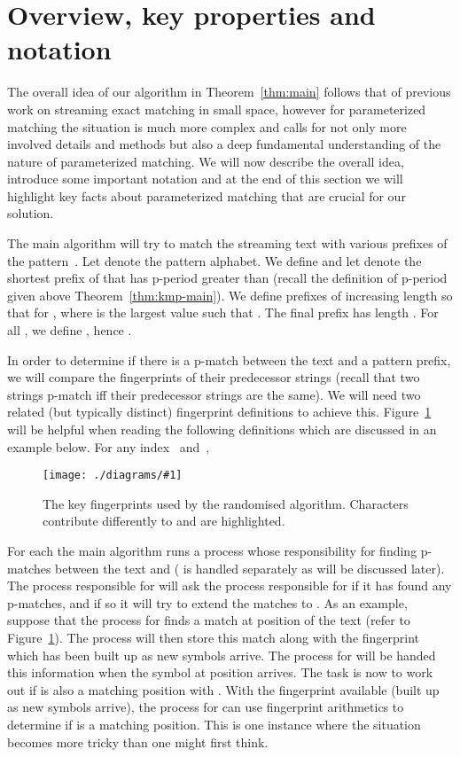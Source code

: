 \documentclass[11pt,a4paper]{article}
\theoremstyle{theorem}
\newcommand{\pmatch}{\mbox{p-match}\xspace}
\newcommand{\pmatches}{\mbox{p-matches}\xspace}
\newcommand{\pperiod}{\mbox{p-period}\xspace}
\newcommand{\insertdiagram}[1]{
    \centering
    \texttt{[image: ./diagrams/\#1]}}
\newcommand{\insertfigure}[2]{
    \begin{figure}[t]
        \centering
        \insertdiagram{#1}
        \caption{#2}
    \end{figure}
    }
\begin{document}
\section{Overview, key properties and notation}\label{sec:overview}

The overall idea of our algorithm in Theorem~\ref{thm:main} follows that of previous work on streaming exact matching in small space, however for parameterized matching the situation is much more complex and calls for not only more involved details and methods but also a deep fundamental understanding of the nature of parameterized matching. We will now describe the overall idea, introduce some important notation and at the end of this section we will highlight  key facts about parameterized matching that are crucial for our solution. 

The main algorithm will try to match the streaming text with various prefixes of the pattern~. Let  denote the pattern alphabet.
We define  and
let  denote the shortest prefix of  that has
\pperiod greater than  (recall the definition of \pperiod given above Theorem~\ref{thm:kmp-main}).
We define  prefixes  of increasing length so that
 for , where  is the largest value such that . The final prefix  has length .
For all , we define , hence . 


In order to determine if there is a \pmatch between the text and a pattern prefix, we will compare the fingerprints of their predecessor strings (recall that two strings \pmatch iff their predecessor strings are the same).
We will need two related (but typically distinct) fingerprint definitions to achieve this. Figure~\ref{fig:fp-output} will be helpful when reading the following definitions which are discussed in an example below.
For any index~ and~,


\insertfigure{phi-fingerprints}{\label{fig:fp-output} The key fingerprints used by the randomised algorithm.
Characters contribute differently to  and  are highlighted.}

For each  the main algorithm runs a process whose responsibility for finding \pmatches between the text and  ( is handled separately as will be discussed later). The process responsible for  will ask the process responsible for  if it has found any \pmatches, and if so it will try to extend the matches to . As an example, suppose that the process for  finds a match at position  of the text (refer to Figure~\ref{fig:fp-output}). The process will then store this match along with the fingerprint  which has been built up as new symbols arrive. The process for  will be handed this information when the symbol at position  arrives. The task is now to work out if  is also a matching position with . With the fingerprint  available (built up as new symbols arrive), the process for  can use fingerprint arithmetics to determine if  is a matching position. This is one instance where the situation becomes more tricky than one might first think.
\end{document}
